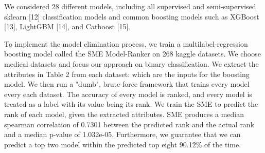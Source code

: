 \documentclass{article}
\begin{document}
We considered 28 different models, including all supervised and semi-supervised sklearn [12] classification models and common boosting models such as XGBoost [13], LightGBM [14], and Catboost [15].

To implement the model elimination process, we train a multilabel-regression boosting model called the SME Model-Ranker on 268 kaggle datasets. We choose medical datasets and focus our approach on binary classification. We extract the attributes in Table 2 from each dataset: which are the inputs for the boosting model. We then run a "dumb", brute-force framework that trains every model every each dataset. The accuracy of every model is ranked, and every model is treated as a label with its value being its rank. We train the SME to predict the rank of each model, given the extracted attributes. SME produces a median spearman correlation of 0.7301 between the predicted rank and the actual rank and a median p-value of 1.032e-05. Furthermore, we guarantee that we can predict a top two model within the predicted top eight 90.12\% of the time.
\end{document}
